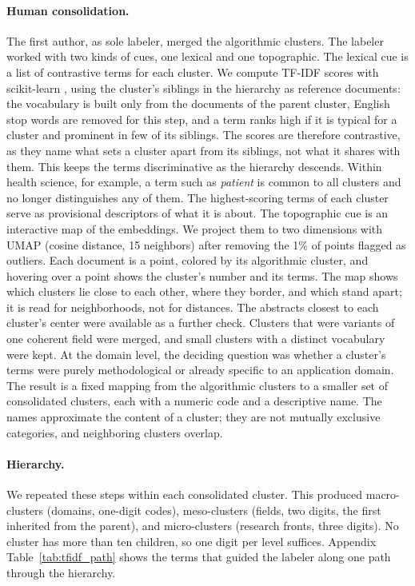 \documentclass[10pt,twocolumn,a4paper]{article}
\begin{document}
	\paragraph{Human consolidation.} The first author, as sole labeler, merged the algorithmic clusters. The labeler worked with two kinds of cues, one lexical and one topographic. The lexical cue is a list of contrastive terms for each cluster. We compute TF-IDF scores with scikit-learn \parencite{pedregosa2011scikit}, using the cluster's siblings in the hierarchy as reference documents: the vocabulary is built only from the documents of the parent cluster, English stop words are removed for this step, and a term ranks high if it is typical for a cluster and prominent in few of its siblings. The scores are therefore contrastive, as they name what sets a cluster apart from its siblings, not what it shares with them. This keeps the terms discriminative as the hierarchy descends. Within health science, for example, a term such as \textit{patient} is common to all clusters and no longer distinguishes any of them. The highest-scoring terms of each cluster serve as provisional descriptors of what it is about. The topographic cue is an interactive map of the embeddings. We project them to two dimensions with UMAP (cosine distance, 15 neighbors) after removing the 1\% of points flagged as outliers. Each document is a point, colored by its algorithmic cluster, and hovering over a point shows the cluster's number and its terms. The map shows which clusters lie close to each other, where they border, and which stand apart; it is read for neighborhoods, not for distances. The abstracts closest to each cluster's center were available as a further check. Clusters that were variants of one coherent field were merged, and small clusters with a distinct vocabulary were kept. At the domain level, the deciding question was whether a cluster's terms were purely methodological or already specific to an application domain. The result is a fixed mapping from the algorithmic clusters to a smaller set of consolidated clusters, each with a numeric code and a descriptive name. The names approximate the content of a cluster; they are not mutually exclusive categories, and neighboring clusters overlap.
	
	\paragraph{Hierarchy.} We repeated these steps within each consolidated cluster. This produced macro-clusters (domains, one-digit codes), meso-clusters (fields, two digits, the first inherited from the parent), and micro-clusters (research fronts, three digits). No cluster has more than ten children, so one digit per level suffices. Appendix Table~\ref{tab:tfidf_path} shows the terms that guided the labeler along one path through the hierarchy.
	
\end{document}
